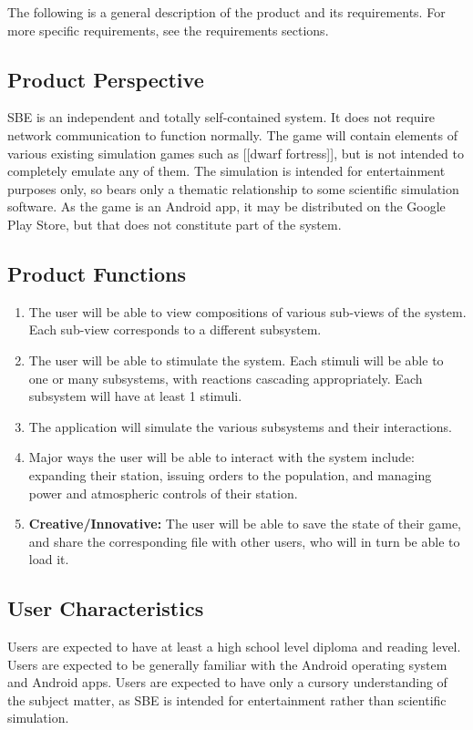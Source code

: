 \documentclass[]{article}
\begin{document}
The following is a general description of the product and its requirements. For more specific requirements, see the requirements sections.

\subsection{Product Perspective}
\label{sub:product_perspective}
	SBE is an independent and totally self-contained system. It does not require network communication to function normally. The game will contain elements of various existing simulation games such as [[dwarf fortress]], but is not intended to completely emulate any of them. The simulation is intended for entertainment purposes only, so bears only a thematic relationship to some scientific simulation software. As the game is an Android app, it may be distributed on the Google Play Store, but that does not constitute part of the system.

\subsection{Product Functions}
\label{sub:product_functions}
	\begin{enumerate}
		\item The user will be able to view compositions of various sub-views of the system. Each sub-view corresponds to a different subsystem.
		\item The user will be able to stimulate the system. Each stimuli will be able to one or many subsystems, with reactions cascading appropriately. Each subsystem will have at least 1 stimuli.
		\item The application will simulate the various subsystems and their interactions.
		\item Major ways the user will be able to interact with the system include: expanding their station, issuing orders to the population, and managing power and atmospheric controls of their station.
		\item \textbf{Creative/Innovative:} The user will be able to save the state of their game, and share the corresponding file with other users, who will in turn be able to load it.
	\end{enumerate}

\subsection{User Characteristics}
\label{sub:user_characteristics}
	Users are expected to have at least a high school level diploma and reading level. Users are expected to be generally familiar with the Android operating system and Android apps. Users are expected to have only a cursory understanding of the subject matter, as SBE is intended for entertainment rather than scientific simulation.
\end{document}
